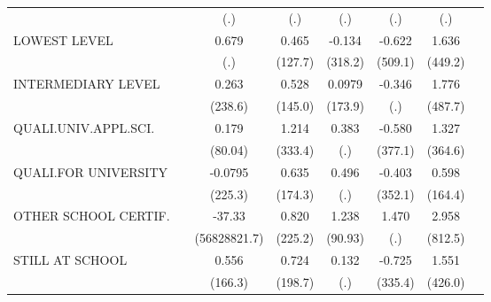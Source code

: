 {\begin{tabular}{l*{7}{c}}
                              &                   &       (.)         &       (.)         &       (.)         &       (.)         &       (.)         &                   \\
[1em]
LOWEST LEVEL                  &                   &     0.679         &     0.465         &    -0.134         &    -0.622         &     1.636         &                   \\
                              &                   &       (.)         &   (127.7)         &   (318.2)         &   (509.1)         &   (449.2)         &                   \\
[1em]
INTERMEDIARY LEVEL            &                   &     0.263         &     0.528         &    0.0979         &    -0.346         &     1.776         &                   \\
                              &                   &   (238.6)         &   (145.0)         &   (173.9)         &       (.)         &   (487.7)         &                   \\
[1em]
QUALI.UNIV.APPL.SCI.          &                   &     0.179         &     1.214         &     0.383         &    -0.580         &     1.327         &                   \\
                              &                   &   (80.04)         &   (333.4)         &       (.)         &   (377.1)         &   (364.6)         &                   \\
[1em]
QUALI.FOR UNIVERSITY          &                   &   -0.0795         &     0.635         &     0.496         &    -0.403         &     0.598         &                   \\
                              &                   &   (225.3)         &   (174.3)         &       (.)         &   (352.1)         &   (164.4)         &                   \\
[1em]
OTHER SCHOOL CERTIF.          &                   &    -37.33         &     0.820         &     1.238         &     1.470         &     2.958         &                   \\
                              &                   &(56828821.7)         &   (225.2)         &   (90.93)         &       (.)         &   (812.5)         &                   \\
[1em]
STILL AT SCHOOL               &                   &     0.556         &     0.724         &     0.132         &    -0.725         &     1.551         &                   \\
                              &                   &   (166.3)         &   (198.7)         &       (.)         &   (335.4)         &   (426.0)         &                   \\

\end{tabular}}
